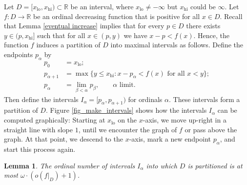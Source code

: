 \documentclass{article}
\newtheorem{Lemma}[Theorem]{Lemma}
\theoremstyle{definition}
\begin{document}
Let $D=[x_{\mathrm{lo}},x_{\mathrm{hi}})\subset\mathbb R$ be an interval, where $x_{\mathrm{lo}}\neq -\infty$ but $x_{\mathrm{hi}}$ could be $\infty$. Let $f:D\to\mathbb R$ be an ordinal decreasing function that is positive for all $x\in D$. Recall that Lemma \ref{eventual increase} implies that for every $p\in D$ there exists $y\in(p,x_{\mathrm{hi}}]$ such that for all $x\in(p,y)$ we have $x-p<f(x)$. Hence, the function $f$ induces a partition of $D$ into maximal intervals as follows. Define the endpoints $p_\alpha$ by
\begin{align*}
    p_0&=x_{\mathrm{lo}};\\
    p_{\alpha+1}&=\max{\{y\le x_{\mathrm{hi}}: x-p_\alpha<f(x) \text{ for all $x<y$}\}};\\
    p_\alpha &= \lim_{\beta<\alpha} p_\beta,\qquad\text{$\alpha$ limit.}
\end{align*}
Then define the intervals $I_\alpha = [p_\alpha, p_{\alpha+1})$ for ordinals $\alpha$. These intervals form a partition of $D$. Figure \ref{fig_make_intervals} shows how the intervals $I_\alpha$ can be computed graphically: Starting at $x_{\mathrm{lo}}$ on the $x$-axis, we move up-right in a straight line with slope $1$, until we encounter the graph of $f$ or pass above the graph. At that point, we descend to the $x$-axis, mark a new endpoint $p_\alpha$, and start this process again.

\begin{Lemma}\label{lem_num_intervals}
    The ordinal number of intervals $I_\alpha$ into which $D$ is partitioned is at most $\omega\cdot(o(f|_D)+1)$.
\end{Lemma}
\end{document}

